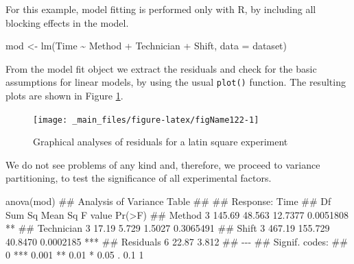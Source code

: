 \documentclass[a4paper,12pt,oneside]{book}
\newenvironment{Shaded}{\begin{snugshade}}{\end{snugshade}}
\newcommand{\SpecialCharTok}[1]{#1}
\newcommand{\DocumentationTok}[1]{#1}
\newcommand{\OtherTok}[1]{#1}
\newcommand{\FunctionTok}[1]{#1}
\newcommand{\AttributeTok}[1]{#1}
\newcommand{\NormalTok}[1]{#1}
\begin{document}
For this example, model fitting is performed only with R, by including all blocking effects in the model.

\begin{Shaded}
\begin{Highlighting}[]
\NormalTok{mod }\OtherTok{\textless{}{-}} \FunctionTok{lm}\NormalTok{(Time }\SpecialCharTok{\textasciitilde{}}\NormalTok{ Method }\SpecialCharTok{+}\NormalTok{ Technician }\SpecialCharTok{+}\NormalTok{ Shift, }\AttributeTok{data =}\NormalTok{ dataset)}
\end{Highlighting}
\end{Shaded}

From the model fit object we extract the residuals and check for the basic assumptions for linear models, by using the usual \texttt{plot()} function. The resulting plots are shown in Figure \ref{fig:figName122}.

\begin{figure}

{\centering \texttt{[image: \_main\_files/figure-latex/figName122-1]} 

}

\caption{Graphical analyses of residuals for a latin square experiment}\label{fig:figName122}
\end{figure}

We do not see problems of any kind and, therefore, we proceed to variance partitioning, to test the significance of all experimental factors.

\begin{Shaded}
\begin{Highlighting}[]
\FunctionTok{anova}\NormalTok{(mod)}
\DocumentationTok{\#\# Analysis of Variance Table}
\DocumentationTok{\#\# }
\DocumentationTok{\#\# Response: Time}
\DocumentationTok{\#\#            Df Sum Sq Mean Sq F value    Pr(\textgreater{}F)    }
\DocumentationTok{\#\# Method      3 145.69  48.563 12.7377 0.0051808 ** }
\DocumentationTok{\#\# Technician  3  17.19   5.729  1.5027 0.3065491    }
\DocumentationTok{\#\# Shift       3 467.19 155.729 40.8470 0.0002185 ***}
\DocumentationTok{\#\# Residuals   6  22.87   3.812                      }
\DocumentationTok{\#\# {-}{-}{-}}
\DocumentationTok{\#\# Signif. codes:  }
\DocumentationTok{\#\# 0 \textquotesingle{}***\textquotesingle{} 0.001 \textquotesingle{}**\textquotesingle{} 0.01 \textquotesingle{}*\textquotesingle{} 0.05 \textquotesingle{}.\textquotesingle{} 0.1 \textquotesingle{} \textquotesingle{} 1}
\end{Highlighting}
\end{Shaded}
\end{document}
